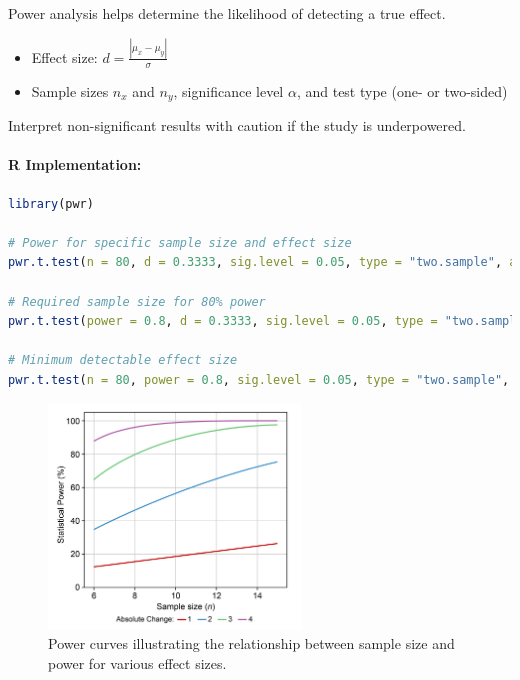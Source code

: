 \documentclass[11pt,a4paper]{article}
\begin{document}
Power analysis helps determine the likelihood of detecting a true effect.
\begin{itemize}
  \item Effect size: $d = \frac{|\mu_x - \mu_y|}{\sigma}$
  \item Sample sizes $n_x$ and $n_y$, significance level $\alpha$, and test type (one- or two-sided)
\end{itemize}

\begin{warningbox}
Interpret non-significant results with caution if the study is underpowered.
\end{warningbox}

\paragraph{R Implementation:}
\begin{lstlisting}[language=R]
library(pwr)

# Power for specific sample size and effect size
pwr.t.test(n = 80, d = 0.3333, sig.level = 0.05, type = "two.sample", alternative = "two.sided")

# Required sample size for 80% power
pwr.t.test(power = 0.8, d = 0.3333, sig.level = 0.05, type = "two.sample", alternative = "two.sided")

# Minimum detectable effect size
pwr.t.test(n = 80, power = 0.8, sig.level = 0.05, type = "two.sample", alternative = "two.sided")
\end{lstlisting}

\begin{figure}[htb]
    \centering
    \includegraphics[width=0.6\textwidth]{power-curve.png}
    \caption{Power curves illustrating the relationship between sample size and power for various effect sizes.}
    \label{fig:power-curve}
\end{figure}
\end{document}
